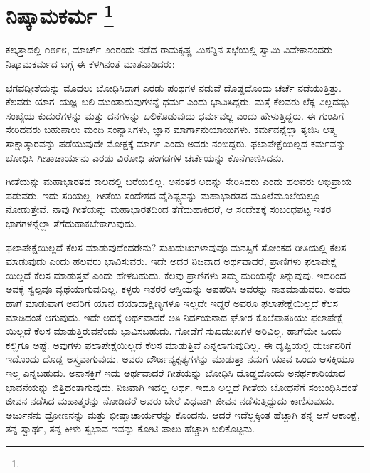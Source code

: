 
\chapter[ನಿಷ್ಕಾಮಕರ್ಮ ]{ನಿಷ್ಕಾಮಕರ್ಮ \protect\footnote{}}

ಕಲ್ಕತ್ತಾದಲ್ಲಿ ೧೮೯೮, ಮಾರ್ಚ್​ ೨೦ರಂದು ನಡೆದ ರಾಮಕೃಷ್ಣ ಮಿಶನ್ನಿನ ಸಭೆಯಲ್ಲಿ ಸ್ವಾಮಿ ವಿವೇಕಾನಂದರು ನಿಷ್ಕಾಮಕರ್ಮದ ಬಗ್ಗೆ ಈ ಕೆಳಗಿನಂತೆ ಮಾತನಾಡಿದರು:

ಭಗವದ್ಗೀತೆಯನ್ನು ಮೊದಲು ಬೋಧಿಸಿದಾಗ ಎರಡು ಪಂಥಗಳ ನಡುವೆ ದೊಡ್ಡದೊಂದು ಚರ್ಚೆ ನಡೆಯುತ್ತಿತ್ತು. ಕೆಲವರು ಯಾಗ–ಯಜ್ಞ–ಬಲಿ ಮುಂತಾದುವುಗಳನ್ನೆ ಧರ್ಮ ಎಂದು ಭಾವಿಸಿದ್ದರು. ಮತ್ತೆ ಕೆಲವರು ಲೆಕ್ಕ ವಿಲ್ಲದಷ್ಟು ಸಂಖ್ಯೆಯ ಕುದುರೆಗಳನ್ನು ಮತ್ತು ದನಗಳನ್ನು ಬಲಿಕೊಡುವುದು ಧರ್ಮವಲ್ಲ ಎಂದು ಹೇಳುತ್ತಿದ್ದರು. ಈ ಗುಂಪಿಗೆ ಸೇರಿದವರು ಬಹುಪಾಲು ಮಂದಿ ಸಂನ್ಯಾಸಿಗಳು, ಜ್ಞಾನ ಮಾರ್ಗಾನುಯಾಯಿಗಳು. ಕರ್ಮವನ್ನೆಲ್ಲಾ ತ್ಯಜಿಸಿ ಆತ್ಮ ಸಾಕ್ಷಾತ್ಕಾರವನ್ನು ಪಡೆಯುವುದೇ ಮೋಕ್ಷಕ್ಕೆ ಮಾರ್ಗ ಎಂದು ಅವರು ನಂಬಿದ್ದರು. ಫಲಾಪೇಕ್ಷೆಯಿಲ್ಲದ ಕರ್ಮವನ್ನು ಬೋಧಿಸಿ ಗೀತಾಚಾರ್ಯನು ಎರಡು ವಿರೋಧಿ ಪಂಗಡಗಳ ಚರ್ಚೆಯನ್ನು ಕೊನೆಗಾಣಿಸಿದನು.

ಗೀತೆಯನ್ನು ಮಹಾಭಾರತದ ಕಾಲದಲ್ಲಿ ಬರೆಯಲಿಲ್ಲ, ಅನಂತರ ಅದನ್ನು ಸೇರಿಸಿದರು ಎಂದು ಹಲವರು ಅಭಿಪ್ರಾಯ ಪಡುವರು. ಇದು ಸರಿಯಲ್ಲ. ಗೀತೆಯ ಸಂದೇಶದ ವೈಶಿಷ್ಟ್ಯವನ್ನು ಮಹಾಭಾರತದ ಮೂಲೆಮೂಲೆಯಲ್ಲೂ ನೋಡುತ್ತೇವೆ. ನಾವು ಗೀತೆಯನ್ನು ಮಹಾಭಾರತದಿಂದ ತೆಗೆದುಹಾಕಿದರೆ, ಆ ಸಂದೇಶಕ್ಕೆ ಸಂಬಂಧಪಟ್ಟ ಇತರ ಭಾಗಗಳನ್ನೆಲ್ಲಾ ತೆಗೆದುಹಾಕಬೇಕಾಗುವುದು.

ಫಲಾಪೇಕ್ಷೆಯಿಲ್ಲದೆ ಕೆಲಸ ಮಾಡುವುದೆಂದರೇನು? ಸುಖದುಃಖಗಳಾವುವೂ ಮನಸ್ಸಿಗೆ ಸೋಂಕದ ರೀತಿಯಲ್ಲಿ ಕೆಲಸ ಮಾಡುವುದು ಎಂದು ಹಲವರು ಭಾವಿಸುವರು. ಇದೇ ಅದರ ನಿಜವಾದ ಅರ್ಥವಾದರೆ, ಪ್ರಾಣಿಗಳು ಫಲಾಪೇಕ್ಷೆ ಯಿಲ್ಲದೆ ಕೆಲಸ ಮಾಡುತ್ತವೆ ಎಂದು ಹೇಳಬಹುದು. ಕೆಲವು ಪ್ರಾಣಿಗಳು ತಮ್ಮ ಮರಿಯನ್ನೇ ತಿನ್ನುವುವು. ಇದರಿಂದ ಅವಕ್ಕೆ ಸ್ವಲ್ಪವೂ ವ್ಯಥೆಯಾಗುವುದಿಲ್ಲ. ಕಳ್ಳರು ಇತರರ ಆಸ್ತಿಯನ್ನು ಅಪಹರಿಸಿ ಅವರನ್ನು ನಾಶಮಾಡುವರು. ಅವರು ಹಾಗೆ ಮಾಡುವಾಗ ಅವರಿಗೆ ಯಾವ ದಯಾದಾಕ್ಷಿಣ್ಯಗಳೂ ಇಲ್ಲದೇ ಇದ್ದರೆ ಅವರೂ ಫಲಾಪೇಕ್ಷೆಯಿಲ್ಲದೆ ಕೆಲಸ ಮಾಡಿದಂತೆ ಆಗುವುದು. ಇದೇ ಅದಕ್ಕೆ ಅರ್ಥವಾದರೆ ಅತಿ ನಿರ್ದಯನಾದ ಘೋರ ಕೊಲೆಪಾತಕಿಯು ಫಲಾಪೇಕ್ಷೆ ಯಿಲ್ಲದೆ ಕೆಲಸ ಮಾಡುತ್ತಿರುವನೆಂದು ಭಾವಿಸಬಹುದು. ಗೋಡೆಗೆ ಸುಖದುಃಖಗಳ ಅರಿವಿಲ್ಲ. ಹಾಗೆಯೇ ಒಂದು ಕಲ್ಲಿಗೂ ಅಷ್ಟೆ. ಅವುಗಳು ಫಲಾಪೇಕ್ಷೆಯಿಲ್ಲದೆ ಕೆಲಸ ಮಾಡುತ್ತಿವೆ ಎನ್ನಲಾಗುವುದಿಲ್ಲ. ಈ ದೃಷ್ಟಿಯಲ್ಲಿ ದುರ್ಜನರಿಗೆ ಇದೊಂದು ದೊಡ್ಡ ಅಸ್ತ್ರವಾಗುವುದು. ಅವರು ದೌರ್ಜನ್ಯಕೃತ್ಯಗಳನ್ನು ಮಾಡುತ್ತಾ ನಮಗೆ ಯಾವ ಒಂದು ಆಸಕ್ತಿಯೂ ಇಲ್ಲ ಎನ್ನಬಹುದು. ಅನಾಸಕ್ತಿಗೆ ಇದು ಅರ್ಥವಾದರೆ ಗೀತೆಯನ್ನು ಬೋಧಿಸಿ ದೊಡ್ಡದೊಂದು ಅನರ್ಥಕಾರಿಯಾದ ಭಾವನೆಯನ್ನು ಬಿತ್ತಿದಂತಾಗುವುದು. ನಿಜವಾಗಿ ಇದಲ್ಲ ಅರ್ಥ. ಇದೂ ಅಲ್ಲದೆ ಗೀತೆಯ ಬೋಧನೆಗೆ ಸಂಬಂಧಿಸಿದಂತೆ ಜೀವನ ನಡೆಸಿದ ಮಹಾತ್ಮರನ್ನು ನೋಡಿದರೆ ಅವರು ಬೇರೆ ವಿಧವಾಗಿ ಜೀವನ ನಡೆಸುತ್ತಿದ್ದುದು ಕಾಣಿಸುವುದು. ಅರ್ಜುನನು ದ್ರೋಣನನ್ನು ಮತ್ತು ಭೀಷ್ಮಾಚಾರ್ಯರನ್ನು ಕೊಂದನು. ಆದರೆ ಇದೆಲ್ಲಕ್ಕಿಂತ ಹೆಚ್ಚಾಗಿ ತನ್ನ ಆಸೆ ಆಕಾಂಕ್ಷೆ, ತನ್ನ ಸ್ವಾರ್ಥ, ತನ್ನ ಕೀಳು ಸ್ವಭಾವ ಇವನ್ನು ಕೋಟಿ ಪಾಲು ಹೆಚ್ಚಾಗಿ ಬಲಿಕೊಟ್ಟನು.

